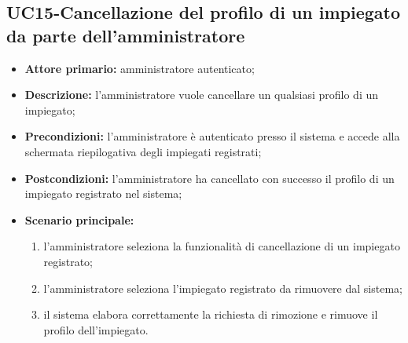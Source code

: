 \subsection{UC15-Cancellazione del profilo di un impiegato da parte dell'amministratore}
\begin{itemize}
	\item \textbf{Attore primario:} amministratore autenticato;

	\item \textbf{Descrizione:} l'amministratore vuole cancellare un qualsiasi profilo di un impiegato;

	\item \textbf{Precondizioni:} l'amministratore è autenticato presso il sistema e accede alla schermata riepilogativa degli impiegati registrati;

	\item \textbf{Postcondizioni:} l'amministratore ha cancellato con successo il profilo di un impiegato registrato nel sistema;

	\item \textbf{Scenario principale:}
	
	\begin{enumerate}
    	\item l'amministratore seleziona la funzionalità di cancellazione di un impiegato registrato;
   	    \item l'amministratore seleziona l'impiegato registrato da rimuovere dal sistema;
 	    \item il sistema elabora correttamente la richiesta di rimozione e rimuove il profilo dell'impiegato.
	\end{enumerate}

\end{itemize}


